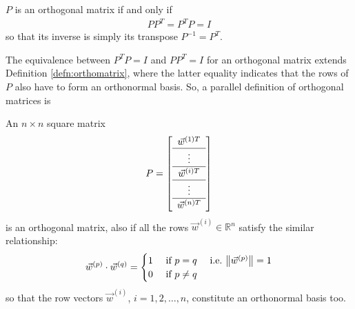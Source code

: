 \begin{proper}
\label{proper:orthoinvT}
$P$ is an orthogonal matrix if and only if 
\begin{align}
PP^T = P^TP = I \label{eqn:orthomatPPT}
\end{align} so that its inverse is simply its transpose $P^{-1} = P^T$.
\end{proper}
The equivalence between $P^TP=I$ and $PP^T = I$ for an orthogonal matrix extends Definition \ref{defn:orthomatrix}, where the latter equality indicates that the rows of $P$ also have to form an orthonormal basis. So, a parallel definition of orthogonal matrices is
\begin{defn}
An $n \times n$ square matrix
\begin{align*}
P = \left[
\begin{array}{c}
\vec{w}^{(1)T}\\
\hline
\vdots \\
\hline
\vec{w}^{(i)T} \Tstrut \\
\hline
\vdots \\
\hline
\vec{w}^{(n)T} \Tstrut 
\end{array}
\right]
\end{align*}
is an orthogonal matrix, also if all the rows $\vec{w}^{(i)} \in \mathbb{R}^n$ satisfy the similar relationship:
\begin{align}
\vec{w}^{(p)} \cdot \vec{w}^{(q)} =
\begin{cases}
1 &\text{ if } p = q \quad \text{ i.e.\ } \norm{\vec{w}^{(p)}} = 1 \\
0 &\text{ if } p \neq q    
\end{cases}
\end{align}
so that the row vectors $\vec{w}^{(i)}$, $i=1,2,\ldots,n$, constitute an orthonormal basis too.
\end{defn}

